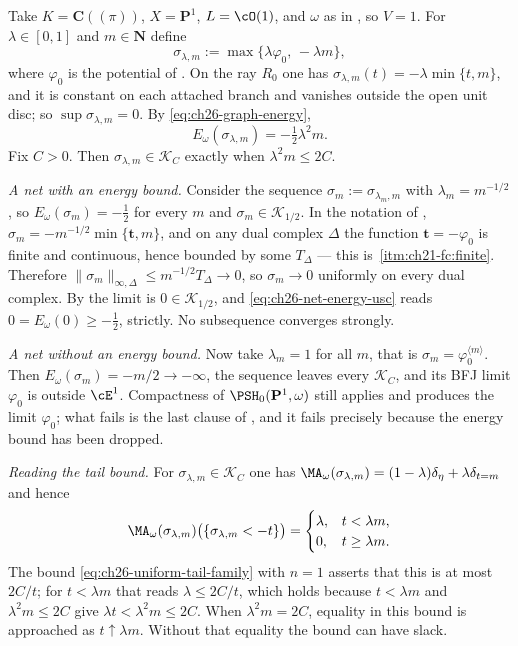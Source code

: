 \begin{example}
\label{ex:ch26-compactness-worked}
Take $K=\mathbf C((\pi))$, $X=\mathbf P^1$, $L=\cO(1)$, and $\omega$
as in , so $V=1$.  For
$\lambda\in[0,1]$ and $m\in\mathbf N$ define
\[
 \sigma_{\lambda,m}:=\max\{\lambda\varphi_0,\,-\lambda m\},
\]
where $\varphi_0$ is the potential of .  On
the ray $R_0$ one has $\sigma_{\lambda,m}(t)=-\lambda\min\{t,m\}$, and
it is constant on each attached branch and vanishes outside the open unit
disc; so
$\sup\sigma_{\lambda,m}=0$.  By \eqref{eq:ch26-graph-energy},
\[
 E_\omega(\sigma_{\lambda,m})=-\tfrac12\lambda^2m .
\]
Fix $C>0$.  Then $\sigma_{\lambda,m}\in\mathcal K_C$ exactly when
$\lambda^2m\leq2C$.

\emph{A net with an energy bound.}  Consider the sequence
$\sigma_m:=\sigma_{\lambda_m,m}$ with
$\lambda_m=m^{-1/2}$, so $E_\omega(\sigma_m)=-\tfrac12$ for every
$m$ and $\sigma_m\in\mathcal K_{1/2}$.  In the notation of
,
$\sigma_m=-m^{-1/2}\min\{\mathbf t,m\}$, and on any dual complex
$\Delta$ the function $\mathbf t=-\varphi_0$ is finite and continuous,
hence bounded by some $T_\Delta$ --- this is
\,\cref{itm:ch21-fc:finite}.  Therefore
$\lVert\sigma_m\rVert_{\infty,\Delta}\leq m^{-1/2}T_\Delta\to0$, so
$\sigma_m\to0$ uniformly on every dual complex.  By
 the limit is $0\in\mathcal K_{1/2}$, and
\eqref{eq:ch26-net-energy-usc} reads
$0=E_\omega(0)\geq-\tfrac12$, strictly.  No subsequence converges strongly.

\emph{A net without an energy bound.}  Now take
$\lambda_m=1$ for all $m$, that is $\sigma_m=\varphi_0^{\langle
m\rangle}$.  Then $E_\omega(\sigma_m)=-m/2\to-\infty$, the sequence leaves
every $\mathcal K_C$, and its BFJ limit $\varphi_0$ is outside
$\cE^1$.  Compactness of $\PSH_0(\mathbf P^1,\omega)$ still applies and
produces the limit $\varphi_0$; what fails is the last clause of
, and it fails precisely because the energy
bound has been dropped.

\emph{Reading the tail bound.}  For $\sigma_{\lambda,m}\in\mathcal K_C$ one
has $\MA_\omega(\sigma_{\lambda,m})
=(1-\lambda)\delta_\eta+\lambda\delta_{t=m}$ and hence
\[
 \MA_\omega(\sigma_{\lambda,m})
   \bigl(\{\sigma_{\lambda,m}<-t\}\bigr)
 =\begin{cases}\lambda,&t<\lambda m,\\ 0,&t\geq\lambda m.\end{cases}
\]
The bound \eqref{eq:ch26-uniform-tail-family} with $n=1$ asserts that this
is at most $2C/t$; for $t<\lambda m$ that reads
$\lambda\leq2C/t$, which holds because
$t<\lambda m$ and $\lambda^2m\leq2C$ give
$\lambda t<\lambda^2m\leq2C$.  When $\lambda^2m=2C$, equality in this bound is approached as
$t\uparrow\lambda m$.  Without that equality the bound can have slack.
\end{example}

